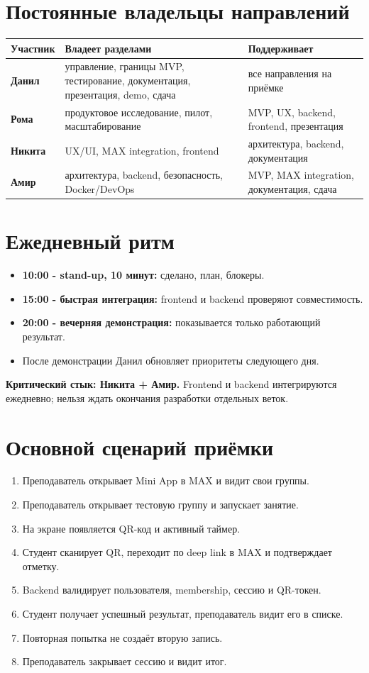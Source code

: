 \documentclass[11pt,a4paper]{article}
\begin{document}
\section{Постоянные владельцы направлений}
\begin{tabularx}{\textwidth}{>{\bfseries}p{25mm}X X}\toprule
Участник & Владеет разделами & Поддерживает\\\midrule
Данил & управление, границы MVP, тестирование, документация, презентация, demo, сдача & все направления на приёмке\\
Рома & продуктовое исследование, пилот, масштабирование & MVP, UX, backend, frontend, презентация\\
Никита & UX/UI, MAX integration, frontend & архитектура, backend, документация\\
Амир & архитектура, backend, безопасность, Docker/DevOps & MVP, MAX integration, документация, сдача\\\bottomrule
\end{tabularx}

\section{Ежедневный ритм}
\begin{itemize}
  \item \textbf{10:00 - stand-up, 10 минут:} сделано, план, блокеры.
  \item \textbf{15:00 - быстрая интеграция:} frontend и backend проверяют совместимость.
  \item \textbf{20:00 - вечерняя демонстрация:} показывается только работающий результат.
  \item После демонстрации Данил обновляет приоритеты следующего дня.
\end{itemize}
\begin{alertbox}\textbf{Критический стык: Никита + Амир.} Frontend и backend интегрируются ежедневно; нельзя ждать окончания разработки отдельных веток.\end{alertbox}

\section{Основной сценарий приёмки}
\begin{enumerate}[leftmargin=1.7em,itemsep=0.25em]
  \item Преподаватель открывает Mini App в MAX и видит свои группы.
  \item Преподаватель открывает тестовую группу и запускает занятие.
  \item На экране появляется QR-код и активный таймер.
  \item Студент сканирует QR, переходит по deep link в MAX и подтверждает отметку.
  \item Backend валидирует пользователя, membership, сессию и QR-токен.
  \item Студент получает успешный результат, преподаватель видит его в списке.
  \item Повторная попытка не создаёт вторую запись.
  \item Преподаватель закрывает сессию и видит итог.
\end{enumerate}
\end{document}
